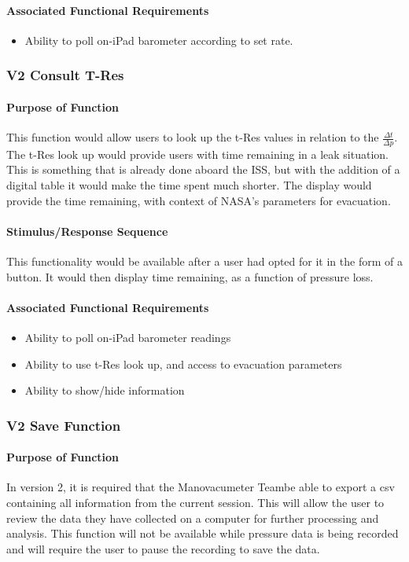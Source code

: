 \documentclass[onecolumn, draftclsnofoot,10pt, compsoc]{IEEEtran}
\def \CapstoneTeamName{Manovacumeter Team}
\begin{document}
\paragraph{Associated Functional Requirements}
\begin{itemize}
\item Ability to poll on-iPad barometer according to set rate.
\end{itemize}

\subsubsection{V2 Consult T-Res}
\paragraph{Purpose of Function}
This function would allow users to look up the t-Res values in relation to the $\frac{\Delta t}{\Delta p}$.
The t-Res look up would provide users with time remaining in a leak situation.
This is something that is already done aboard the ISS, but with the addition of a digital table it would make the time spent much shorter.
The display would provide the time remaining, with context of NASA's parameters for evacuation.
\paragraph{Stimulus/Response Sequence}
This functionality would be available after a user had opted for it in the form of a button.
It would then display time remaining, as a function of pressure loss.
\paragraph{Associated Functional Requirements}
\begin{itemize}
\item Ability to poll on-iPad barometer readings
\item Ability to use t-Res look up, and access to evacuation parameters
\item Ability to show/hide information
\end{itemize}

\subsubsection{V2 Save Function}
\paragraph{Purpose of Function}
In version 2, it is required that the \CapstoneTeamName be able to export a csv containing all information from the current session.
This will allow the user to review the data they have collected on a computer for further processing and analysis.
This function will not be available while pressure data is being recorded and will require the user to pause the recording to save the data.
\end{document}
